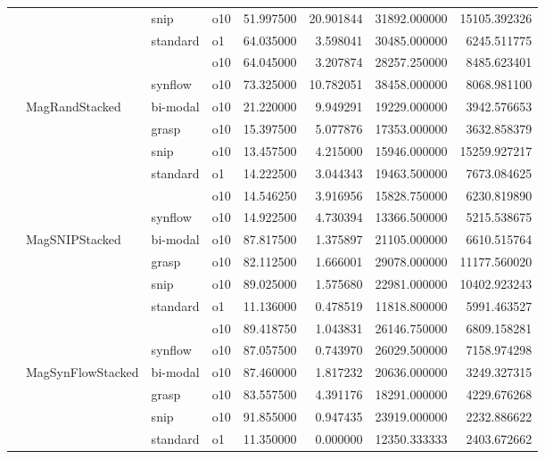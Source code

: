 \begin{longtable}{llllrrrr}
      &     & snip & o10 &  51.997500 &  20.901844 &     31892.000000 &  15105.392326 \\
      &     & standard & o1 &  64.035000 &   3.598041 &     30485.000000 &   6245.511775 \\
      &     &         & o10 &  64.045000 &   3.207874 &     28257.250000 &   8485.623401 \\
      &     & synflow & o10 &  73.325000 &  10.782051 &     38458.000000 &   8068.981100 \\
      & MagRandStacked & bi-modal & o10 &  21.220000 &   9.949291 &     19229.000000 &   3942.576653 \\
      &     & grasp & o10 &  15.397500 &   5.077876 &     17353.000000 &   3632.858379 \\
      &     & snip & o10 &  13.457500 &   4.215000 &     15946.000000 &  15259.927217 \\
      &     & standard & o1 &  14.222500 &   3.044343 &     19463.500000 &   7673.084625 \\
      &     &         & o10 &  14.546250 &   3.916956 &     15828.750000 &   6230.819890 \\
      &     & synflow & o10 &  14.922500 &   4.730394 &     13366.500000 &   5215.538675 \\
      & MagSNIPStacked & bi-modal & o10 &  87.817500 &   1.375897 &     21105.000000 &   6610.515764 \\
      &     & grasp & o10 &  82.112500 &   1.666001 &     29078.000000 &  11177.560020 \\
      &     & snip & o10 &  89.025000 &   1.575680 &     22981.000000 &  10402.923243 \\
      &     & standard & o1 &  11.136000 &   0.478519 &     11818.800000 &   5991.463527 \\
      &     &         & o10 &  89.418750 &   1.043831 &     26146.750000 &   6809.158281 \\
      &     & synflow & o10 &  87.057500 &   0.743970 &     26029.500000 &   7158.974298 \\
      & MagSynFlowStacked & bi-modal & o10 &  87.460000 &   1.817232 &     20636.000000 &   3249.327315 \\
      &     & grasp & o10 &  83.557500 &   4.391176 &     18291.000000 &   4229.676268 \\
      &     & snip & o10 &  91.855000 &   0.947435 &     23919.000000 &   2232.886622 \\
      &     & standard & o1 &  11.350000 &   0.000000 &     12350.333333 &   2403.672662 \\

\end{longtable}
